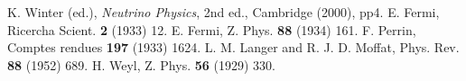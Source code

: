 \begin{thebibliography}{99}
K. Winter (ed.), \emph{Neutrino Physics}, 2nd
  ed., Cambridge (2000), pp4.
E. Fermi, Ricercha Scient. \textbf{2} (1933) 12.
E. Fermi, Z. Phys. \textbf{88} (1934) 161.
F. Perrin, Comptes rendues \textbf{197} (1933)
  1624.
L. M. Langer and R. J. D. Moffat, Phys. Rev.
  \textbf{88} (1952) 689.
H. Weyl, Z. Phys. \textbf{56} (1929) 330.
\end{thebibliography}


